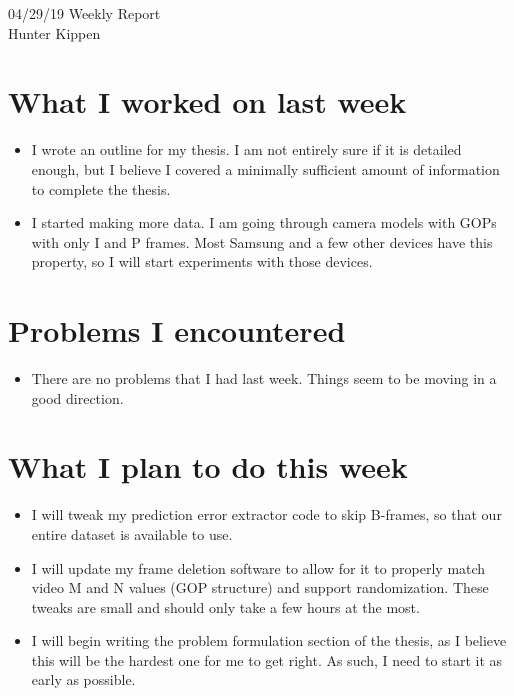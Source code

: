\documentclass[12pt]{article}%
\def\bi{\begin{itemize}     %
\vspace{-0.5em}\setlength\itemsep{0em}}
\begin{document}
\begin{center}
{\LARGE 04/29/19 Weekly Report}\\
\vspace{0.5em}
{\Large Hunter Kippen}
\vspace{0.5em}
\end{center}


\section{What I worked on last week}
\bi
\item I wrote an outline for my thesis. I am not entirely sure if it is detailed enough, but I believe I covered a minimally sufficient amount of information to complete the thesis.
\item I started making more data. I am going through camera models with GOPs with only I and P frames. Most Samsung and a few other devices have this property, so I will start experiments with those devices.
\end{itemize}

\section{Problems I encountered}
\bi
\item There are no problems that I had last week. Things seem to be moving in a good direction.
\end{itemize}

\section{What I plan to do this week}
\bi
\item I will tweak my prediction error extractor code to skip B-frames, so that our entire dataset is available to use.
\item I will update my frame deletion software to allow for it to properly match video M and N values (GOP structure) and support randomization. These tweaks are small and should only take a few hours at the most.
\item I will begin writing the problem formulation section of the thesis, as I believe this will be the hardest one for me to get right. As such, I need to start it as early as possible.
\end{itemize}



\begin{comment}
\pagebreak
%


%
\end{comment}
\end{document}
